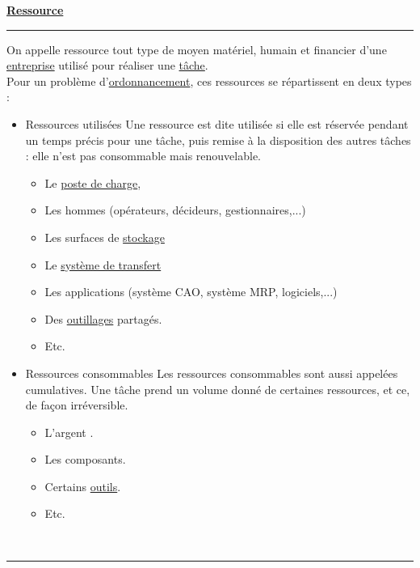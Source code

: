 \documentclass[12pt,a4paper,twoside]{article}
\newcommand{\definition}[3]{
	\begin{minipage}{\textwidth}
		\textbf{\large{#1}}\\
		\rule{\textwidth}{0.5pt}
		#2\\
		\ifthenelse{\isempty{#3}}%
	    {}%
	    {\rule{\textwidth}{0.25pt}\\\textit{#3}}%
    \end{minipage}
    \\\\
}
\begin{document}
\definition{\href{http://gpr.insa-lyon.fr/supgedem/Home/Le_monde_industriel/L_entreprise/Le_systeme_physique_de_production/ressources.htm}{Ressource}}
{
	On appelle ressource tout type de moyen matériel, humain et financier d'une \href{http://gpr.insa-lyon.fr/supgedem/Home/Le_monde_industriel/L_entreprise/lentreprise.htm}{entreprise} utilisé pour réaliser une \href{http://gpr.insa-lyon.fr/supgedem/Home/glossaire/glestach.htm}{tâche}.\\
Pour un problème d'\href{http://gpr.insa-lyon.fr/supgedem/Home/glossaire/gLordonnancement.htm}{ordonnancement}, ces ressources se répartissent en deux types :
\begin{itemize}
	\item Ressources utilisées
		Une ressource est dite utilisée si elle est réservée pendant un temps précis pour une tâche, puis remise à la disposition des autres tâches : elle n'est pas consommable mais renouvelable.
		\begin{itemize}
		\item Le \href{http://gpr.insa-lyon.fr/supgedem/Home/Le_monde_industriel/L_entreprise/Le_systeme_physique_de_production/lepostedecharge.htm}{poste de charge},
		\item Les hommes (opérateurs, décideurs, gestionnaires,...)
		\item Les surfaces de \href{http://gpr.insa-lyon.fr/supgedem/Home/Le_monde_industriel/L_entreprise/Le_systeme_physique_de_production/Le_stock/lestock.htm}{stockage}
		\item Le \href{http://gpr.insa-lyon.fr/supgedem/Home/Le_monde_industriel/L_entreprise/Le_systeme_physique_de_production/letransfert.htm}{système de transfert}
		\item Les applications (système CAO, système MRP, logiciels,...)
		\item Des \href{http://gpr.insa-lyon.fr/supgedem/Home/Le_monde_industriel/L_entreprise/Le_systeme_physique_de_production/outillage.htm}{outillages} partagés.
		\item Etc.
	\end{itemize}
	\item Ressources consommables
		Les ressources consommables sont aussi appelées cumulatives. Une tâche prend un volume donné de certaines ressources, et ce, de façon irréversible.
		\begin{itemize}
		\item L'argent .
		\item Les composants.
		\item Certains \href{http://gpr.insa-lyon.fr/supgedem/Home/Le_monde_industriel/L_entreprise/Le_systeme_physique_de_production/outillage.htm}{outils}.
		\item Etc.
	\end{itemize}
\end{itemize}~
	}{}
	
\end{document}
